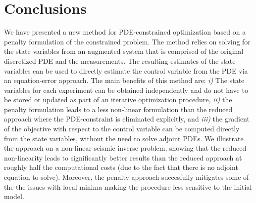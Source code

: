 \documentclass{iopart}
\begin{document}
%
%
%
%

\section{Conclusions}
\label{conclusion}
We have presented a new method for PDE-constrained optimization based on
a penalty formulation of the constrained problem. The method
relies on solving for the state variables from an augmented system that
is comprised of the original discretized PDE and the measurements. The
resulting estimates of the state variables can be used to directly
estimate the control variable from the PDE via an equation-error
approach. The main benefits of this method are: \emph{i)} The state
variables for each experiment can be obtained independently and do not
have to be stored or updated as part of an iterative optimization
procedure, \emph{ii)} the penalty formulation leads to a less non-linear
formulation than the reduced approach where the PDE-constraint is
eliminated explicitly, and \emph{iii)} the gradient of the objective
with respect to the control variable can be computed directly from the
state variables, without the need to solve adjoint PDEs. We illustrate
the approach on a non-linear seismic inverse problem, showing that the
reduced non-linearity leads to significantly better results than the
reduced approach at roughly half the computational costs (due to the
fact that there is no adjoint equation to solve). Moreover, the penalty
approach succesfully mitigates some of the the issues with local minima
making the procedure less sensitive to the initial model.
\end{document}
